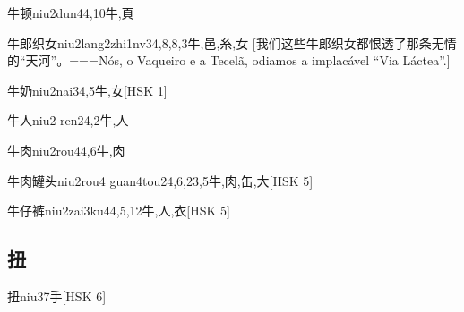 \begin{EntryWithPhonetic}{牛顿}{niu2dun4}{4,10}{⽜,⾴}
\end{EntryWithPhonetic}

\begin{EntryWithPhonetic}{牛郎织女}{niu2lang2zhi1nv3}{4,8,8,3}{⽜,⾢,⽷,⼥}
  [我们这些牛郎织女都恨透了那条无情的``天河''。===Nós, o Vaqueiro e a Tecelã, odiamos a implacável ``Via Láctea''.]
\end{EntryWithPhonetic}

\begin{EntryWithPhonetic}{牛奶}{niu2nai3}{4,5}{⽜,⼥}[HSK 1]
\end{EntryWithPhonetic}

\begin{EntryWithPhonetic}{牛人}{niu2 ren2}{4,2}{⽜,⼈}
\end{EntryWithPhonetic}

\begin{EntryWithPhonetic}{牛肉}{niu2rou4}{4,6}{⽜,⾁}
\end{EntryWithPhonetic}

\begin{EntryWithPhonetic}{牛肉罐头}{niu2rou4 guan4tou2}{4,6,23,5}{⽜,⾁,⽸,⼤}[HSK 5]
\end{EntryWithPhonetic}

\begin{EntryWithPhonetic}{牛仔裤}{niu2zai3ku4}{4,5,12}{⽜,⼈,⾐}[HSK 5]
\end{EntryWithPhonetic}

\subsection*{扭}

\begin{EntryWithPhonetic}{扭}{niu3}{7}{⼿}[HSK 6]
\end{EntryWithPhonetic}

